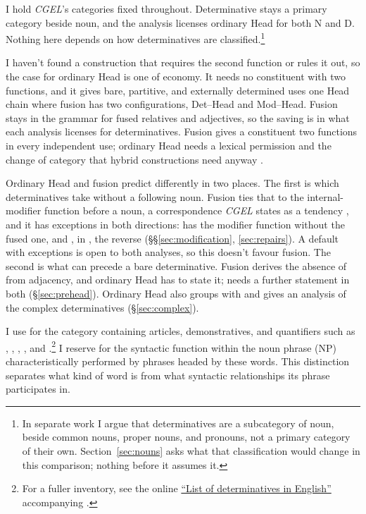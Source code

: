 \documentclass[12pt]{article}
\begin{document}
I hold \textit{CGEL}'s categories fixed throughout. Determinative stays a primary category beside noun, and the analysis licenses ordinary Head for both N and D. Nothing here depends on how determinatives are classified.\footnote{In separate work I argue that determinatives are a subcategory of noun, beside common nouns, proper nouns, and pronouns, not a primary category of their own. Section~\ref{sec:nouns} asks what that classification would change in this comparison; nothing before it assumes it.}

I haven't found a construction that requires the second function or rules it out, so the case for ordinary Head is one of economy. It needs no constituent with two functions, and it gives bare, partitive, and externally determined uses one Head chain where fusion has two configurations, Det--Head and Mod--Head. Fusion stays in the grammar for fused relatives and adjectives, so the saving is in what each analysis licenses for determinatives. Fusion gives a constituent two functions in every independent use; ordinary Head needs a lexical permission and the change of category that hybrid constructions need anyway \citep[571]{Payne2007}.

Ordinary Head and fusion predict differently in two places. The first is which determinatives take  without a following noun. Fusion ties that to the internal-modifier function before a noun, a correspondence \textit{CGEL} states as a tendency \citep[410, 415]{huddleston2002}, and it has exceptions in both directions:  has the modifier function without the fused one, and , in , the reverse (§§\ref{sec:modification}, \ref{sec:repairs}). A default with exceptions is open to both analyses, so this doesn't favour fusion. The second is what can precede a bare determinative. Fusion derives the absence of  from adjacency, and ordinary Head has to state it;  needs a further statement in both (§\ref{sec:prehead}). Ordinary Head also groups  with  and gives an analysis of the complex determinatives (§\ref{sec:complex}).

I use  for the category containing articles, demonstratives, and quantifiers such as , , , , and .\footnote{For a fuller inventory, see the online \href{https://www.cambridge.org/highereducation/api/resources/2AC8DF5CA558F8A6FCDFACD0EAF8EA08}{\enquote{List of determinatives in English}} accompanying \textcite{Huddleston2021}.} I reserve  for the syntactic function within the noun phrase (NP) characteristically performed by phrases headed by these words. This distinction separates what kind of word  is from what syntactic relationships its phrase participates in.
\end{document}
